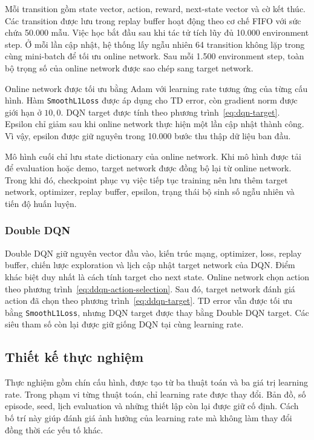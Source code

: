 Mỗi transition gồm state vector, action, reward, next-state vector và cờ kết thúc. Các transition được lưu trong replay buffer hoạt động theo cơ chế FIFO với sức chứa 50.000 mẫu. Việc học bắt đầu sau khi tác tử tích lũy đủ 10.000 environment step. Ở mỗi lần cập nhật, hệ thống lấy ngẫu nhiên 64 transition không lặp trong cùng mini-batch để tối ưu online network. Sau mỗi 1.500 environment step, toàn bộ trọng số của online network được sao chép sang target network.

Online network được tối ưu bằng Adam với learning rate tương ứng của từng cấu hình. Hàm \texttt{SmoothL1Loss} được áp dụng cho TD error, còn gradient norm được giới hạn ở $10{,}0$. DQN target được tính theo phương trình~\eqref{eq:dqn-target}. Epsilon chỉ giảm sau khi online network thực hiện một lần cập nhật thành công. Vì vậy, epsilon được giữ nguyên trong 10.000 bước thu thập dữ liệu ban đầu.

Mô hình cuối chỉ lưu state dictionary của online network. Khi mô hình được tải để evaluation hoặc demo, target network được đồng bộ lại từ online network. Trong khi đó, checkpoint phục vụ việc tiếp tục training nên lưu thêm target network, optimizer, replay buffer, epsilon, trạng thái bộ sinh số ngẫu nhiên và tiến độ huấn luyện.

\subsubsection{Double DQN}

Double DQN giữ nguyên vector đầu vào, kiến trúc mạng, optimizer, loss, replay buffer, chiến lược exploration và lịch cập nhật target network của DQN. Điểm khác biệt duy nhất là cách tính target cho next state. Online network chọn action theo phương trình~\eqref{eq:ddqn-action-selection}. Sau đó, target network đánh giá action đã chọn theo phương trình~\eqref{eq:ddqn-target}. TD error vẫn được tối ưu bằng \texttt{SmoothL1Loss}, nhưng DQN target được thay bằng Double DQN target. Các siêu tham số còn lại được giữ giống DQN tại cùng learning rate.

\subsection{Thiết kế thực nghiệm}

Thực nghiệm gồm chín cấu hình, được tạo từ ba thuật toán và ba giá trị learning rate. Trong phạm vi từng thuật toán, chỉ learning rate được thay đổi. Bản đồ, số episode, seed, lịch evaluation và những thiết lập còn lại được giữ cố định. Cách bố trí này giúp đánh giá ảnh hưởng của learning rate mà không làm thay đổi đồng thời các yếu tố khác.

